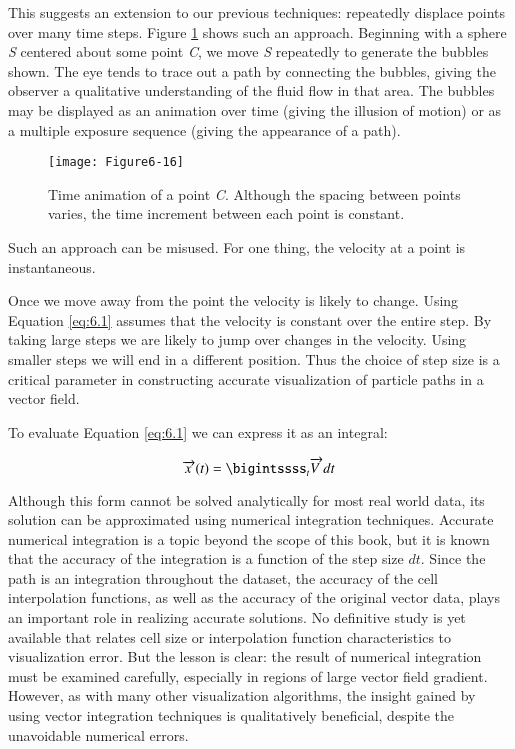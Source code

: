 This suggests an extension to our previous techniques: repeatedly displace points over many time steps. Figure \ref{fig:Figure6-16} shows such an approach. Beginning with a sphere \emph{S} centered about some point \emph{C}, we move \emph{S} repeatedly to generate the bubbles shown. The eye tends to trace out a path by connecting the bubbles, giving the observer a qualitative understanding of the fluid flow in that area. The bubbles may be displayed as an animation over time (giving the illusion of motion) or as a multiple exposure sequence (giving the appearance of a path).

\begin{figure}[htb]
	\texttt{[image: Figure6-16]}
	\caption{Time animation of a point \emph{C}. Although the spacing between points varies, the time increment between each point is constant.}\label{fig:Figure6-16}
\end{figure}

Such an approach can be misused. For one thing, the velocity at a point is instantaneous.

Once we move away from the point the velocity is likely to change. Using Equation \ref{eq:6.1} assumes that the velocity is constant over the entire step. By taking large steps we are likely to jump over changes in the velocity. Using smaller steps we will end in a different position. Thus the choice of step size is a critical parameter in constructing accurate visualization of particle paths in a vector field.

To evaluate Equation \ref{eq:6.1} we can express it as an integral:

\begin{equation}\label{eq:6.2}
\overrightarrow{x\ }(t) = \bigintssss_{t}\overrightarrow{V\ }dt
\end{equation}

Although this form cannot be solved analytically for most real world data, its solution can be approximated using numerical integration techniques. Accurate numerical integration is a topic beyond the scope of this book, but it is known that the accuracy of the integration is a function of the step size \emph{$dt$}. Since the path is an integration throughout the dataset, the accuracy of the cell interpolation functions, as well as the accuracy of the original vector data, plays an important role in realizing accurate solutions. No definitive study is yet available that relates cell size or interpolation function characteristics to visualization error. But the lesson is clear: the result of numerical integration must be examined carefully, especially in regions of large vector field gradient. However, as with many other visualization algorithms, the insight gained by using vector integration techniques is qualitatively beneficial, despite the unavoidable numerical errors.

